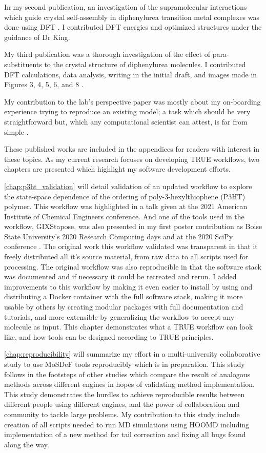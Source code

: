 In my second publication, an investigation of the supramolecular interactions which guide crystal self-assembly in diphenylurea transition metal complexes was done using DFT \cite{Millard2019a}.
I contributed DFT energies and optimized structures under the guidance of Dr King.

My third publication was a thorough investigation of the effect of para-substituents to the crystal structure of diphenylurea molecules. I contributed DFT calculations, data analysis, writing in the initial draft, and images made in Figures 3, 4, 5, 6, and 8 \cite{Fothergill2021}.

My contribution to the lab's perspective paper was mostly about my on-boarding experience trying to reproduce an existing model; a task which should be very straightforward but, which any computational scientist can attest, is far from simple \cite{Jankowski2019}.

These published works are included in the appendices for readers with interest in these topics. As my current research focuses on developing TRUE workflows, two chapters are presented which highlight my software development efforts.

\autoref{chap:p3ht_validation} will detail validation of an updated workflow to explore the state-space dependence of the ordering of poly-3-hexylthiophene (P3HT) polymer. 
This workflow was highlighted in a talk given at the 2021 American Institute of Chemical Engineers conference. 
And one of the tools used in the workflow, GIXStapose, was also presented in my first poster contribution as Boise State University's 2020 Research Computing days and at the 2020 SciPy conference \cite{gixstapose, scipy2020}. 
The original work this workflow validated was transparent in that it freely distributed all it's source material, from raw data to all scripts used for processing.
The original workflow was also reproducible in that the software stack was documented and if necessary it could be recreated and rerun.
I added improvements to this workflow by making it even easier to install by using and distributing a Docker container with the full software stack, making it more usable by others by creating modular packages with full documentation and tutorials, and more extensible by generalizing the workflow to accept any molecule as input.
This chapter demonstrates what a TRUE workflow can look like, and how tools can be designed according to TRUE principles.

\autoref{chap:reproducibility} will summarize my effort in a multi-university collaborative study to use MoSDeF tools reproducibly which is in preparation. 
This study follows in the footsteps of other studies which compare the result of analogous methods across different engines in hopes of validating method implementation\citep{Shirts2017, Loeffler2018, Schappals2017}. 
This study demonstrates the hurdles to achieve reproducible results between different people using different engines, and the power of collaboration and community to tackle large problems.
My contribution to this study include creation of all scripts needed to run MD simulations using HOOMD including implementation of a new method for tail correction and fixing all bugs found along the way. 

